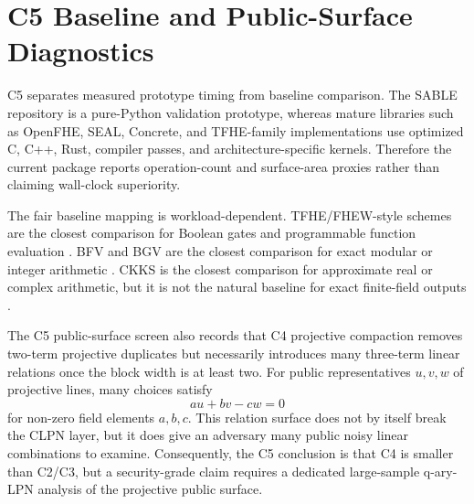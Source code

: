 \section{C5 Baseline and Public-Surface Diagnostics}
\label{app:c5-baselines}

C5 separates measured prototype timing from baseline comparison.  The SABLE
repository is a pure-Python validation prototype, whereas mature libraries
such as OpenFHE, SEAL, Concrete, and TFHE-family implementations use
optimized C, C++, Rust, compiler passes, and architecture-specific kernels.
Therefore the current package reports operation-count and surface-area
proxies rather than claiming wall-clock superiority.

The fair baseline mapping is workload-dependent.  TFHE/FHEW-style schemes
are the closest comparison for Boolean gates and programmable function
evaluation \cite{DucasMicciancio2015,CGGI2020}.  BFV and BGV are the closest
comparison for exact modular or integer arithmetic \cite{FanVercauteren2012,BGV2014}.
CKKS is the closest comparison for approximate real or complex arithmetic,
but it is not the natural baseline for exact finite-field outputs
\cite{CKKS2017}.

The C5 public-surface screen also records that C4 projective compaction
removes two-term projective duplicates but necessarily introduces many
three-term linear relations once the block width is at least two.  For public
representatives \(u,v,w\) of projective lines, many choices satisfy
\[
    au+bv-cw=0
\]
for non-zero field elements \(a,b,c\).  This relation surface does not by
itself break the CLPN layer, but it does give an adversary many public noisy
linear combinations to examine.  Consequently, the C5 conclusion is that C4
is smaller than C2/C3, but a security-grade claim requires a dedicated
large-sample q-ary-LPN analysis of the projective public surface.
